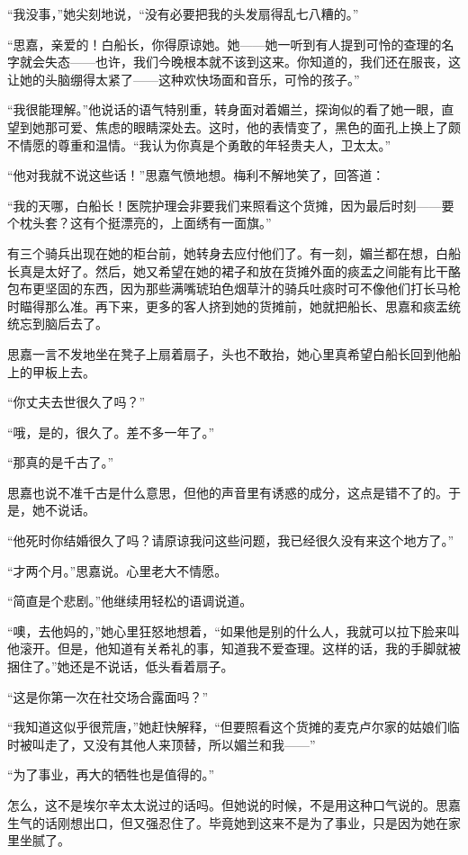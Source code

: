 \par “我没事，”她尖刻地说，“没有必要把我的头发扇得乱七八糟的。”
\par “思嘉，亲爱的！白船长，你得原谅她。她——她一听到有人提到可怜的查理的名字就会失态——也许，我们今晚根本就不该到这来。你知道的，我们还在服丧，这让她的头脑绷得太紧了——这种欢快场面和音乐，可怜的孩子。”
\par “我很能理解。”他说话的语气特别重，转身面对着媚兰，探询似的看了她一眼，直望到她那可爱、焦虑的眼睛深处去。这时，他的表情变了，黑色的面孔上换上了颇不情愿的尊重和温情。“我认为你真是个勇敢的年轻贵夫人，卫太太。”
\par “他对我就不说这些话！”思嘉气愤地想。梅利不解地笑了，回答道：
\par “我的天哪，白船长！医院护理会非要我们来照看这个货摊，因为最后时刻——要个枕头套？这有个挺漂亮的，上面绣有一面旗。”
\par 有三个骑兵出现在她的柜台前，她转身去应付他们了。有一刻，媚兰都在想，白船长真是太好了。然后，她又希望在她的裙子和放在货摊外面的痰盂之间能有比干酪包布更坚固的东西，因为那些满嘴琥珀色烟草汁的骑兵吐痰时可不像他们打长马枪时瞄得那么准。再下来，更多的客人挤到她的货摊前，她就把船长、思嘉和痰盂统统忘到脑后去了。
\par 思嘉一言不发地坐在凳子上扇着扇子，头也不敢抬，她心里真希望白船长回到他船上的甲板上去。
\par “你丈夫去世很久了吗？”
\par “哦，是的，很久了。差不多一年了。”
\par “那真的是千古了。”
\par 思嘉也说不准千古是什么意思，但他的声音里有诱惑的成分，这点是错不了的。于是，她不说话。
\par “他死时你结婚很久了吗？请原谅我问这些问题，我已经很久没有来这个地方了。”
\par “才两个月。”思嘉说。心里老大不情愿。
\par “简直是个悲剧。”他继续用轻松的语调说道。
\par “噢，去他妈的，”她心里狂怒地想着，“如果他是别的什么人，我就可以拉下脸来叫他滚开。但是，他知道有关希礼的事，知道我不爱查理。这样的话，我的手脚就被捆住了。”她还是不说话，低头看着扇子。
\par “这是你第一次在社交场合露面吗？”
\par “我知道这似乎很荒唐，”她赶快解释，“但要照看这个货摊的麦克卢尔家的姑娘们临时被叫走了，又没有其他人来顶替，所以媚兰和我——”
\par “为了事业，再大的牺牲也是值得的。”
\par 怎么，这不是埃尔辛太太说过的话吗。但她说的时候，不是用这种口气说的。思嘉生气的话刚想出口，但又强忍住了。毕竟她到这来不是为了事业，只是因为她在家里坐腻了。
